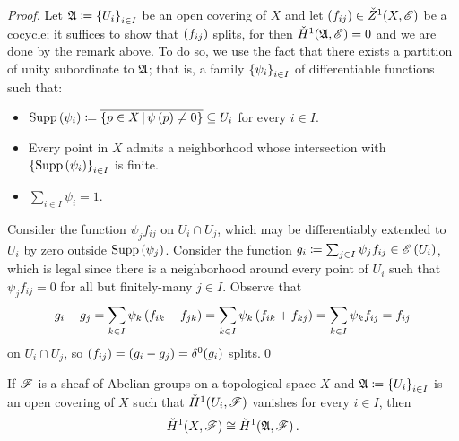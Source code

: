 \documentclass[../Moduli_Spaces_of_Riemann_Surfaces.tex]{subfiles}
\begin{document}
    \begin{proof}
        Let $\mathfrak{A}\coloneqq\left\{U_i\right\}_{i\in I}$ be an open covering of $X$ and let $\left(f_{ij}\right)\in\check{Z}^1\!\left(X,\mathscr{E}\right)$ be a cocycle; it suffices to show that $\left(f_{ij}\right)$ splits, for then $\check{H}^1\!\left(\mathfrak{A},\mathscr{E}\right)=0$ and we are done by the remark above. To do so, we use the fact that there exists a partition of unity subordinate to $\mathfrak{A}$; that is, a family $\left\{\psi_i\right\}_{i\in I}$ of differentiable functions such that:
        \begin{itemize}
            \item $\operatorname{Supp}\left(\psi_i\right)\coloneqq\overline{\left\{p\in X\,\middle\vert\,\psi\left(p\right)\neq0\right\}}\subseteq U_i$ for every $i\in I$.
                \vspace{-0.05in}
            \item Every point in $X$ admits a neighborhood whose intersection with $\left\{\operatorname{Supp}\left(\psi_i\right)\right\}_{i\in I}$ is finite.
                \vspace{-0.05in}
            \item $\sum_{i\in I}\psi_i=1$.
        \end{itemize}
        Consider the function $\psi_jf_{ij}$ on $U_i\cap U_j$, which may be differentiably extended to $U_i$ by zero outside $\operatorname{Supp}\left(\psi_j\right)$. Consider the function $g_i\coloneqq\sum_{j\in I}\psi_jf_{ij}\in\mathscr{E}\left(U_i\right)$, which is legal since there is a neighborhood around every point of $U_i$ such that $\psi_jf_{ij}=0$ for all but finitely-many $j\in I$. Observe that
        \begin{equation*}
            g_i-g_j=\sum_{k\in I}\psi_k\left(f_{ik}-f_{jk}\right)=\sum_{k\in I}\psi_k\left(f_{ik}+f_{kj}\right)=\sum_{k\in I}\psi_kf_{ij}=f_{ij}
        \end{equation*}
        on $U_i\cap U_j$, so $\left(f_{ij}\right)=\left(g_i-g_j\right)=\delta^0\!\left(g_i\right)$ splits.\qed
    \end{proof}
    \begin{proposition}[Leray]
        If $\mathscr{F}$ is a sheaf of Abelian groups on a topological space $X$ and $\mathfrak{A}\coloneqq\left\{U_i\right\}_{i\in I}$ is an open covering of $X$ such that $\check{H}^1\!\left(U_i,\mathscr{F}\right)$ vanishes for every $i\in I$, then
        \begin{equation*}
            \check{H}^1\!\left(X,\mathscr{F}\right)\cong\check{H}^1\!\left(\mathfrak{A},\mathscr{F}\right).
        \end{equation*}
    \end{proposition}
\end{document}
